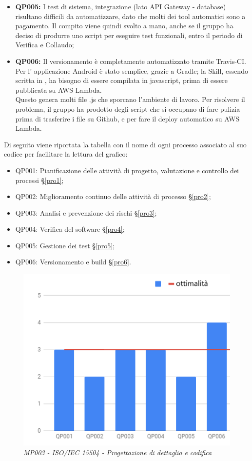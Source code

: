 \begin{itemize}
	\item \textbf{QP005:} I test di sistema, integrazione (lato API Gateway - database) risultano difficili da automatizzare, dato che molti dei tool automatici sono a pagamento. Il compito viene quindi svolto a mano, anche se il gruppo ha deciso di produrre uno script per eseguire test funzionali, entro il periodo di Verifica e Collaudo;
	\item \textbf{QP006:} Il versionamento è completamente automatizzato tramite Travis-CI. Per l' applicazione Android è stato semplice, grazie a Gradle; la Skill, essendo scritta in , ha bisogno di essere compilata in javascript, prima di essere pubblicata su AWS Lambda. \\Questo genera molti file .js che sporcano l'ambiente di lavoro. Per risolvere il problema, il gruppo ha prodotto degli script che si occupano di fare pulizia prima di trasferire i file su Github, e per fare il deploy automatico su AWS Lambda.
\end{itemize}
Di seguito viene riportata la tabella con il nome di ogni processo associato al suo codice per facilitare la lettura del grafico:
\begin{itemize}
	\item QP001: Pianificazione delle attività di progetto, valutazione e controllo dei processi \S\ref{pro1};
	\item QP002: Miglioramento continuo delle attività di processo \S\ref{pro2};
	\item QP003: Analisi e prevenzione dei rischi \S\ref{pro3};
	\item QP004: Verifica del software \S\ref{pro4};
	\item QP005: Gestione dei test \S\ref{pro5};
	\item QP006: Versionamento e build \S\ref{pro6}.
\end{itemize}
\begin{figure}[H]
    \centering
	\includegraphics[scale=0.7]{./images/spicePDC.png}
    \caption{\textit{MP003 - ISO/IEC 15504 - Progettazione di dettaglio e codifica}}
\end{figure}

